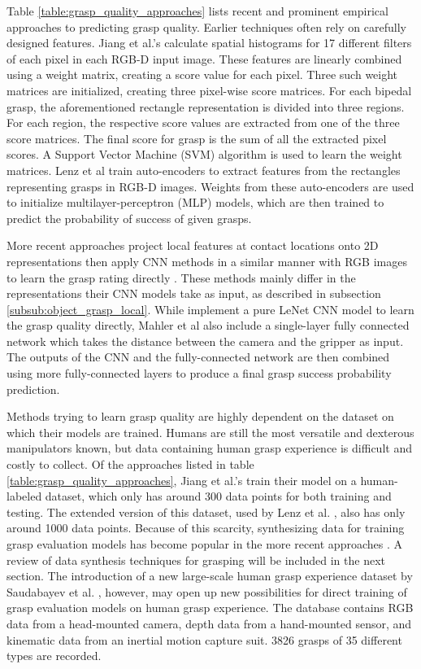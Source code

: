 Table \ref{table:grasp_quality_approaches} lists recent and prominent empirical approaches to predicting grasp quality.
Earlier techniques often rely on carefully designed features. Jiang et al.'s \cite{jiang2011} calculate spatial
histograms for 17 different filters of each pixel in each RGB-D input image. These features are linearly combined using
a weight matrix, creating a score value for each pixel. Three such weight matrices are initialized, creating three
pixel-wise score matrices. For each bipedal grasp, the aforementioned rectangle representation is divided into three
regions. For each region, the respective score values are extracted from one of the three score matrices. The final
score for grasp is the sum of all the extracted pixel scores. A Support Vector Machine (SVM) algorithm is used to learn
the weight matrices. Lenz et al \cite{lenz2015} train auto-encoders to extract features from the rectangles
representing grasps in RGB-D images. Weights from these auto-encoders are used to initialize multilayer-perceptron
(MLP) models, which are then trained to predict the probability of success of given grasps.

More recent approaches project local features at contact locations onto 2D representations then apply CNN methods in a
similar manner with RGB images to learn the grasp rating directly \cite{Gualtieri2016,mahler2017,Kappler2015}. These
methods mainly differ in the representations their CNN models take as input, as described in subsection
\ref{subsub:object_grasp_local}. While \cite{Gualtieri2016,Kappler2015} implement a pure LeNet CNN model \cite{Gu2018}
to learn the grasp quality directly, Mahler et al \cite{mahler2017} also include a single-layer fully connected network
which takes the distance between the camera and the gripper as input. The outputs of the CNN and the fully-connected
network are then combined using more fully-connected layers to produce a final grasp success probability prediction.

Methods trying to learn grasp quality are highly dependent on the dataset on which their models are trained. Humans
are still the most versatile and dexterous manipulators known, but data containing human grasp experience is difficult
and costly to collect. Of the approaches listed in table \ref{table:grasp_quality_approaches}, Jiang et al.'s
\cite{jiang2011} train their model on a human-labeled dataset, which only has around 300 data points for both training
and testing. The extended version of this dataset, used by Lenz et al. \cite{lenz2015}, also has only around 1000 data
points. Because of this scarcity, synthesizing data for training grasp evaluation models has become popular in the more
recent approaches \cite{Kappler2015,Gualtieri2016,mahler2017}. A review of data synthesis techniques for grasping will
be included in the next section. The introduction of a new large-scale human grasp experience dataset by Saudabayev et
al. \cite{Saudabayev2018}, however, may open up new possibilities for direct training of grasp evaluation models on
human grasp experience. The database contains RGB data from a head-mounted camera, depth data from a hand-mounted
sensor, and kinematic data from an inertial motion capture suit. 3826 grasps of 35 different types are recorded.


